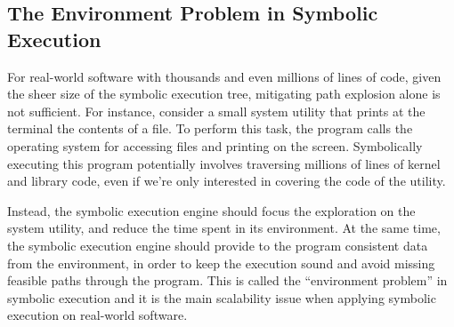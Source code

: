 \subsection{The Environment Problem in Symbolic Execution}


For real-world software with thousands and even millions of lines of code, given the sheer size of the symbolic execution tree, mitigating path explosion alone is not sufficient.
%
For instance, consider a small system utility that prints at the terminal the contents of a file.  To perform this task, the program calls the operating system for accessing files and printing on the screen.
%
Symbolically executing this program potentially involves traversing millions of lines of kernel and library code, even if we're only interested in covering the code of the utility.



Instead, the symbolic execution engine should focus the exploration on the system utility, and reduce the time spent in its environment.
%
At the same time, the symbolic execution engine should provide to the program consistent data from the environment, in order to keep the execution sound and avoid missing feasible paths through the program.
%
This is called the ``environment problem'' in symbolic execution and it is the main scalability issue when applying symbolic execution on real-world software.


